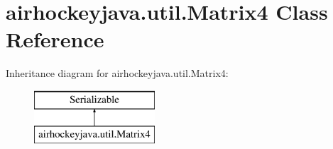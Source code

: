 \hypertarget{classairhockeyjava_1_1util_1_1_matrix4}{}\section{airhockeyjava.\+util.\+Matrix4 Class Reference}
\label{classairhockeyjava_1_1util_1_1_matrix4}
Inheritance diagram for airhockeyjava.\+util.\+Matrix4\+:\begin{figure}[H]
\begin{center}
\leavevmode
\includegraphics[height=2.000000cm]{classairhockeyjava_1_1util_1_1_matrix4}
\end{center}
\end{figure}

